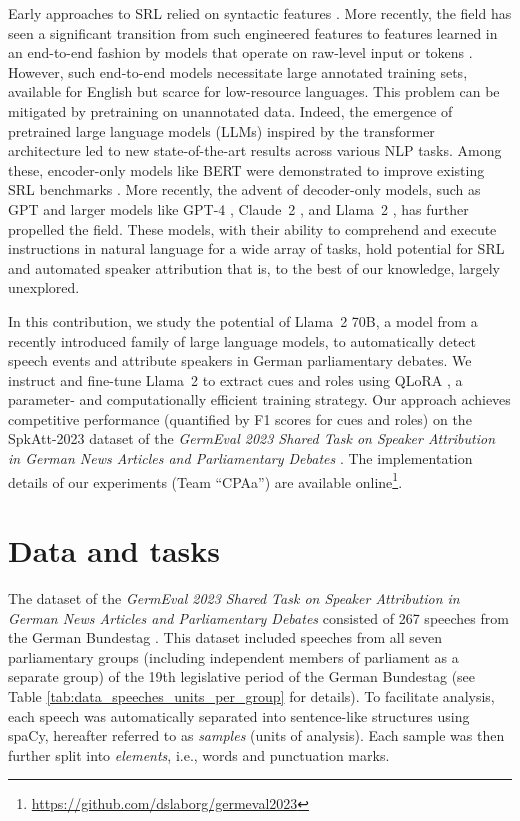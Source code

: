 \documentclass[11pt,a4paper]{article}
\begin{document}
Early approaches to SRL relied on syntactic features \cite{Navigli2022,Larionov2019}. More recently, the field has seen a significant transition from such engineered features to features learned in an end-to-end fashion by models that operate on raw-level input or tokens \cite{Collobert2011}. However, such end-to-end models necessitate large annotated training sets, available for English but scarce for low-resource languages. This problem can be mitigated by pretraining on unannotated data. Indeed, the emergence of pretrained large language models (LLMs) inspired by the transformer architecture \cite{Vaswani2017} led to new state-of-the-art results across various NLP tasks. Among these, encoder-only models like BERT were demonstrated to improve existing SRL benchmarks \cite{ShiP2019}. More recently, the advent of decoder-only models, such as GPT \cite{Radford2018} and larger models like GPT-4 \cite{GPT4-2023}, Claude~2 \cite{Bai2022}, and Llama~2 \cite{Touvron2023b}, has further propelled the field. These models, with their ability to comprehend and execute instructions in natural language for a wide array of tasks, hold potential for SRL and automated speaker attribution that is, to the best of our knowledge, largely unexplored.

In this contribution, we study the potential of Llama~2 70B, a model from a recently introduced family of large language models, to automatically detect speech events and attribute speakers in German parliamentary debates. We instruct and fine-tune Llama~2 to extract cues and roles using QLoRA \cite{Dettmers2023}, a parameter- and computationally efficient training strategy. Our approach achieves competitive performance (quantified by F1 scores for cues and roles) on the SpkAtt-2023 dataset of the \emph{GermEval 2023 Shared Task on Speaker Attribution in German News Articles and Parliamentary Debates} \cite{GermEval2023}. The implementation details of our experiments (Team \enquote{CPAa}) are available online\footnote{\url{https://github.com/dslaborg/germeval2023}}.
 
\section{Data and tasks}
\label{sec:data_and_tasks}

The dataset of the \emph{GermEval 2023 Shared Task on Speaker Attribution in German News Articles and Parliamentary Debates} consisted of 267 speeches from the German Bundestag \cite{GermEval2023}.
This dataset included speeches from all seven parliamentary groups (including independent members of parliament as a separate group) of the 19th legislative period of the German Bundestag (see Table \ref{tab:data_speeches_units_per_group} for details).
To facilitate analysis, each speech was automatically separated into sentence-like structures using spaCy, hereafter referred to as \emph{samples} (units of analysis).
Each sample was then further split into \emph{elements}, i.e., words and punctuation marks.
\end{document}
